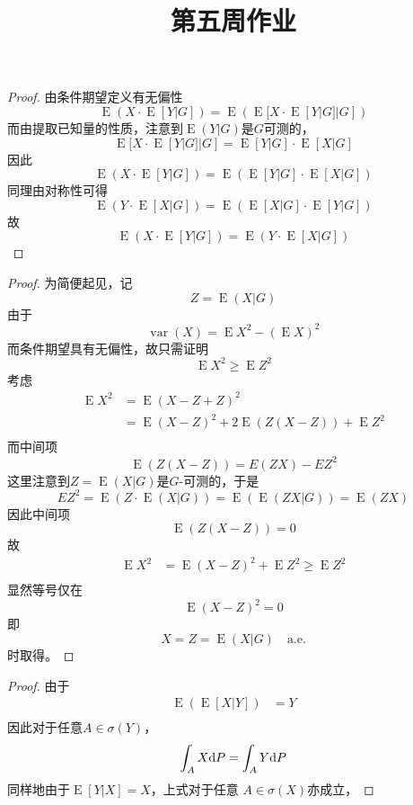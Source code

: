 \documentclass[cn]{homework}
\title{第五周作业}
\DeclareMathOperator{\E}{E}
\DeclareMathOperator{\var}{var}
\begin{document}
    \maketitle

    \problem
    \begin{proof}
        由条件期望定义有无偏性
        \[\E(X\cdot \E[Y|G])=\E(\E[X\cdot \E[Y|G]|G])\]
        而由提取已知量的性质，注意到$\E(Y|G)$是$G$可测的，
        \[\E[X\cdot \E[Y|G]|G]=\E[Y|G]\cdot \E[X|G]\]
        因此
        \[\E(X\cdot \E[Y|G])=\E(\E[Y|G]\cdot \E[X|G])\]
        同理由对称性可得
        \[\E(Y\cdot \E[X|G])=\E(\E[X|G]\cdot \E[Y|G])\]
        故
        \[\E(X\cdot \E[Y|G])=\E(Y\cdot \E[X|G])\]
    \end{proof}

    \problem
    \begin{subproblem}
        \item
        \begin{proof}
            为简便起见，记
            \[Z=\E(X|G)\]
            由于
            \[\var(X)=\E X^2-(\E X)^2\]
            而条件期望具有无偏性，故只需证明
            \[\E X^2\geq \E Z^2\]
            考虑
            \[\begin{aligned}
                \E X^2&=\E(X-Z+Z)^2\\
                &=\E(X-Z)^2+2\E(Z(X-Z))+\E Z^2\\
            \end{aligned}\]
            而中间项
            \[\E(Z(X-Z))=E(ZX)-EZ^2\]
            这里注意到$Z=\E(X|G)$是$G$-可测的，于是
            \[EZ^2=\E(Z\cdot\E(X|G))=\E(\E(ZX|G))=\E(ZX)\]
            因此中间项
            \[\E(Z(X-Z))=0\]
            故
            \[\begin{aligned}
                \E X^2&=\E(X-Z)^2+\E Z^2\geq \E Z^2\\
            \end{aligned}\]
            显然等号仅在
            \[\E (X-Z)^2=0\]
            即
            \[X=Z=\E(X|G)\quad\text{a.e.}\]
            时取得。
        \end{proof}

        \item
        \begin{proof}
            由于
            \[\begin{aligned}
                \E(\E[X|Y])&=Y\\
            \end{aligned}\]
            因此对于任意$A\in\sigma(Y)$，
            \[\int_AX\mathrm d P=\int_AY\mathrm d P\]
            同样地由于$\E[Y|X]=X$，上式对于任意
            $A\in\sigma(X)$亦成立，


\end{proof}
\end{subproblem}
\end{document}
